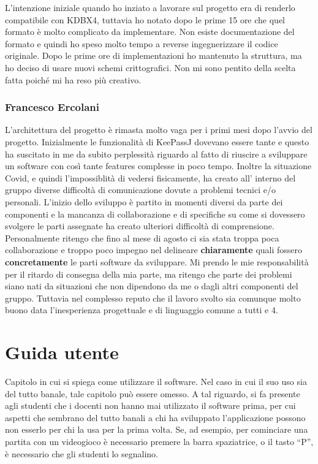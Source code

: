 \documentclass[a4paper,12pt]{report}
\begin{document}
L'intenzione iniziale quando ho inziato a lavorare sul progetto era di renderlo
compatibile con KDBX4, tuttavia ho notato dopo le prime 15 ore che quel formato
è molto complicato da implementare. Non esiste documentazione del formato e quindi
ho speso molto tempo a reverse ingegnerizzare il codice originale. Dopo le prime ore
di implementazioni ho mantenuto la struttura, ma ho deciso di usare nuovi schemi
crittografici. Non mi sono pentito della scelta fatta poiché mi ha reso più creativo.

\subsection*{Francesco Ercolani}
L'architettura del progetto è rimasta molto vaga per i primi mesi dopo l'avvio del progetto. 
Inizialmente le funzionalità di KeePassJ dovevano essere tante e questo ha suscitato in me 
da subito perplessità riguardo al fatto di riuscire a sviluppare un software con così tante 
features complesse in poco tempo.
Inoltre la situazione Covid, e quindi l'impossiblità di vedersi fisicamente, ha creato all'
interno del gruppo diverse difficoltà di comunicazione dovute a problemi tecnici e/o personali.
L'inizio dello sviluppo è partito in momenti diversi da parte dei componenti e la mancanza di 
collaborazione e di specifiche su come si dovessero svolgere le parti assegnate ha creato ulteriori difficoltà di comprensione.
Personalmente ritengo che fino al mese di agosto ci sia stata troppa poca collaborazione e 
troppo poco impegno nel delineare \textbf{chiaramente} quali fossero \textbf{concretamente} 
le parti software da sviluppare.
Mi prendo le mie responsabilità per il ritardo di consegna della mia parte, ma ritengo che 
parte dei problemi siano nati da situazioni che non dipendono da me o dagli altri componenti del gruppo.
Tuttavia nel complesso reputo che il lavoro svolto sia comunque molto buono data 
l'inesperienza progettuale e di linguaggio comune a tutti e 4.

\appendix
\chapter{Guida utente}

Capitolo in cui si spiega come utilizzare il software. Nel caso in cui il suo uso sia del tutto 
banale, tale capitolo può essere omesso.
%
A tal riguardo, si fa presente agli studenti che i docenti non hanno mai utilizzato il software 
prima, per cui aspetti che sembrano del tutto banali a chi ha sviluppato l'applicazione possono non 
esserlo per chi la usa per la prima volta.
%
Se, ad esempio, per cominciare una partita con un videogioco è necessario premere la barra 
spaziatrice, o il tasto ``P'', è necessario che gli studenti lo segnalino.
\end{document}

